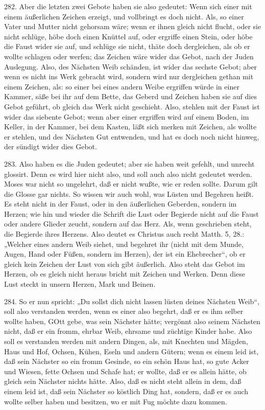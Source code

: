 282. Aber die letzten zwei Gebote haben sie also gedeutet: Wenn sich einer mit einem äußerlichen Zeichen erzeigt, und vollbringt es doch nicht. Als, so einer Vater und Mutter nicht gehorsam wäre; wenn er ihnen gleich nicht flucht, oder sie nicht schlüge, höbe doch einen Knüttel auf, oder ergriffe einen Stein, oder höbe die Faust wider sie auf, und schlüge sie nicht, thäte doch dergleichen, als ob er wollte schlagen oder werfen; das Zeichen wäre wider das Gebot, nach der Juden Auslegung. Also, des Nächsten Weib schänden, ist wider das sechste Gebot; aber wenn es nicht ins Werk gebracht wird, sondern wird nur dergleichen gethan mit einem Zeichen, als: so einer bei eines andern Weibe ergriffen würde in einer Kammer, säße bei ihr auf dem Bette, das Geberd und Zeichen haben sie auf dies Gebot geführt, ob gleich das Werk nicht geschieht. Also, stehlen mit der Faust ist wider das siebente Gebot; wenn aber einer ergriffen wird auf einem Boden, im Keller, in der Kammer, bei dem Kasten, läßt sich merken mit Zeichen, als wollte er stehlen, und des Nächsten Gut entwenden, und hat es doch noch nicht hinweg, der sündigt wider dies Gebot.

283. Also haben es die Juden gedeutet; aber sie haben weit gefehlt, und unrecht glossirt. Denn es wird hier nicht also, und soll auch also nicht gedeutet werden. Moses war nicht so ungelehrt, daß er nicht wußte, wie er reden sollte. Darum gilt die Glosse gar nichts. So wissen wir auch wohl, was Lüsten und Begehren heißt. Es steht nicht in der Faust, oder in den äußerlichen Geberden, sondern im Herzen; wie hin und wieder die Schrift die Lust oder Begierde nicht auf die Faust oder andere Glieder zeucht, sondern auf das Herz. Als, wenn geschrieben steht, die Begierde ihres Herzens. Also deutet es Christus auch recht Matth. 5, 28.: „Welcher eines andern Weib siehet, und begehret ihr (nicht mit dem Munde, Augen, Hand oder Füßen, sondern im Herzen), der ist ein Ehebrecher“, ob er gleich kein Zeichen der Lust von sich gibt äußerlich. Also steht das Gebot im Herzen, ob es gleich nicht heraus bricht mit Zeichen und Werken. Denn diese Lust steckt in unsern Herzen, Mark und Beinen.

284. So er nun spricht: „Du sollst dich nicht lassen lüsten deines Nächsten Weib“, soll also verstanden werden, wenn es einer also begehrt, daß er es ihm selber wollte haben, GOtt gebe, was sein Nächster hätte; vergönnt also seinem Nächsten nicht, daß er ein fromm, ehrbar Weib, ehrsame und züchtige Kinder habe. Also soll es verstanden werden mit andern Dingen, als, mit Knechten und Mägden, Haus und Hof, Ochsen, Kühen, Eseln und andern Gütern; wenn es einem leid ist, daß sein Nächster so ein fromm Gesinde, so ein schön Haus hat, so gute Acker und Wiesen, fette Ochsen und Schafe hat; er wollte, daß er es allein hätte, ob gleich sein Nächster nichts hätte. Also, daß es nicht steht allein in dem, daß einem leid ist, daß sein Nächster so köstlich Ding hat, sondern, daß er es auch wollte selber haben und besitzen, wo er mit Fug möchte dazu kommen.

